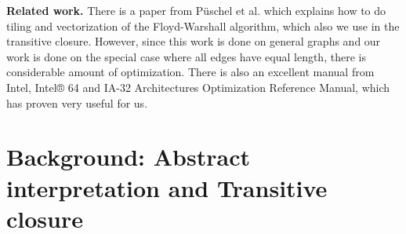 \documentclass[letterpaper]{article}
\newcommand{\mypar}[1]{{\bf #1.}}
\begin{document}
\mypar{Related work} There is a paper from P\"uschel et al. which explains how to do tiling and vectorization of the Floyd-Warshall algorithm, which also we use in the transitive closure. However, since this work is done on general graphs and our work is done on the special case where all edges have equal length, there is considerable amount of optimization. There is also an excellent manual from Intel, Intel® 64 and IA-32 Architectures Optimization Reference Manual, which has proven very useful for us. 

%
%
%

\section{Background: Abstract interpretation and Transitive closure}\label{sec:background}
\end{document}

